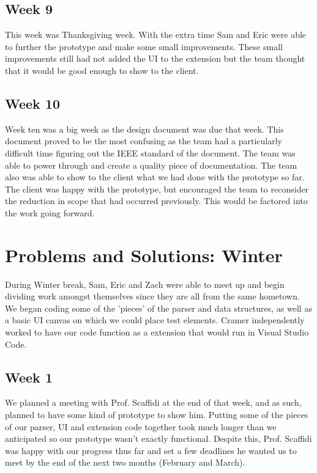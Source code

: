\documentclass[letterpaper,10pt,titlepage,draftclsnofoot,onecolumn,onesided] {IEEEtran}
\begin{document}
	\subsection{Week 9}
	This week was Thanksgiving week. 
	With the extra time Sam and Eric were able to further the prototype and make some small improvements.
	These small improvements still had not added the UI to the extension but the team thought that it would be good enough to show to the client. 

	\subsection{Week 10}
	Week ten was a big week as the design document was due that week. 
	This document proved to be the most confusing as the team had a particularly difficult time figuring out the IEEE standard of the document. 
	The team was able to power through and create a quality piece of documentation. 
	The team also was able to show to the client what we had done with the prototype so far. 
	The client was happy with the prototype, but encouraged the team to reconsider the reduction in scope that had occurred previously.
	This would be factored into the work going forward.
	
\section{Problems and Solutions: Winter}
	During Winter break, Sam, Eric and Zach were able to meet up and begin dividing work amongst themselves since they are all from the same hometown. 
	We began coding some of the 'pieces' of the parser and data structures, as well as a basic UI canvas on which we could place test elements. 
	Cramer independently worked to have our code function as a extension that would run in Visual Studio Code.
	
	\subsection{Week 1} 
	We planned a meeting with Prof. Scaffidi at the end of that week, and as such, planned to have some kind of prototype to show him. 
	Putting some of the pieces of our parser, UI and extension code together took much longer than we anticipated so our prototype wasn't exactly functional.
	Despite this, Prof. Scaffidi was happy with our progress thus far and set a few deadlines he wanted us to meet by the end of the next two months (February and March).
	
\end{document}
